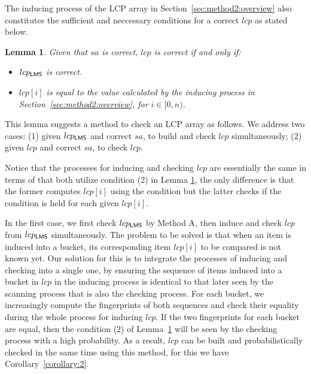 \documentclass[10pt,journal,compsoc]{IEEEtran}
\newtheorem{Lemma}{Lemma}
\begin{document}
	The inducing process of the LCP array in Section~\ref{sec:method2:overview} also constitutes the sufficient and neccessary conditions for a correct $lcp$ as stated below.
	
	\begin{Lemma}
		\label{lcp:correct}
		Given that $sa$ is correct, $lcp$ is correct if and only if:
		\begin{itemize}
			\item[(1)]
			$lcp_{\sf LMS}$ is correct.
			
			\item[(2)]
			$lcp[i]$ is equal to the value calculated by the inducing process in Section~\ref{sec:method2:overview}, for $i \in [0, n)$.

		\end{itemize}
	\end{Lemma}
	
	
	This lemma suggests a method to check an LCP array as follows.
	We address two cases: (1) given $lcp_{\sf LMS}$ and correct $sa$, to build and check $lcp$ simultaneously; (2) given $lcp$ and correct $sa$, to check $lcp$.
	
	Notice that the processes for inducing and checking $lcp$ are essentially the same in terms of that both utilize condition (2) in Lemma \ref{lcp:correct}, the only difference is that the former computes $lcp[i]$ using the condition but the latter checks if the condition is held for each given $lcp[i]$.
	
	\vspace{1ex}  In the first case, we first check $lcp_{\sf LMS}$ by Method A, then induce and check $lcp$ from $lcp_{\sf LMS}$ simultaneously. The problem to be solved is that when an item is induced into a bucket, its corresponding item $lcp[i]$ to be compared is not known yet.
	Our solution for this is to integrate the processes of inducing and checking into a single one, by ensuring the sequence of items induced into a bucket in $lcp$ in the inducing process is identical to that later seen by the scanning process that is also the checking process.
	For each bucket, we increasingly compute the fingerprints of both sequences and check their equality during the whole process for inducing $lcp$.
	If the two fingerprints for each bucket are equal, then the condition (2) of Lemma~\ref{lcp:correct} will be seen by the checking process with a high probability.
	As a result, $lcp$ can be built and probabilistically checked in the same time using this method, for this we have Corollary~\ref{corollary:2}.
	
\end{document}
